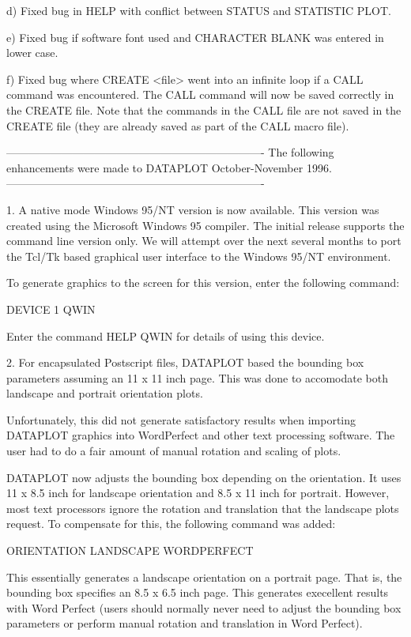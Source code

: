 {    d) Fixed bug in HELP with conflict between STATUS and
       STATISTIC PLOT.

    e) Fixed bug if software font used and CHARACTER BLANK was
       entered in lower case.

    f) Fixed bug where CREATE <file> went into an infinite loop if
       a CALL command was encountered.  The CALL command will now
       be saved correctly in the CREATE file.  Note that the commands
       in the CALL file are not saved in the CREATE file (they are
       already saved as part of the CALL macro file).


----------------------------------------------------------------------
The following enhancements were made to DATAPLOT October-November 1996.
----------------------------------------------------------------------

 1. A native mode Windows 95/NT version is now available.  This
    version was created using the Microsoft Windows 95 compiler.
    The initial release supports the command line version only.
    We will attempt over the next several months to port the
    Tcl/Tk based graphical user interface to the Windows 95/NT
    environment.

    To generate graphics to the screen for this version, enter
    the following command:

        DEVICE 1 QWIN

    Enter the command HELP QWIN for details of using this device.

 2. For encapsulated Postscript files, DATAPLOT based the bounding
    box parameters assuming an 11 x 11 inch page.  This was done to
    accomodate both landscape and portrait orientation plots. 

    Unfortunately, this did not generate satisfactory results when
    importing DATAPLOT graphics into WordPerfect and other text
    processing software.  The user had to do a fair amount of manual
    rotation and scaling of plots.

    DATAPLOT now adjusts the bounding box depending on the orientation.
    It uses 11 x 8.5 inch for landscape orientation and 8.5 x 11 inch
    for portrait.  However, most text processors ignore the rotation
    and translation that the landscape plots request.  To compensate
    for this, the following command was added:

         ORIENTATION LANDSCAPE WORDPERFECT

    This essentially generates a landscape orientation on a portrait
    page.  That is, the bounding box specifies an 8.5 x 6.5 inch page.
    This generates execellent results with Word Perfect (users should
    normally never need to adjust the bounding box parameters or
    perform manual rotation and translation in Word Perfect).

}
